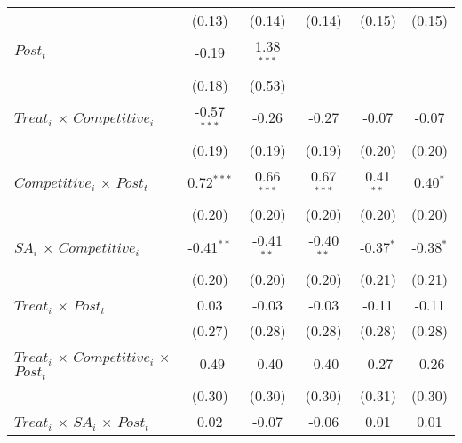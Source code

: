 \documentclass[
]{article}
\begin{document}
\begin{table}[htbp]
\begin{tabular}{lccccc}
                                                                              & (0.13)        & (0.14)        & (0.14)       & (0.15)      & (0.15)\\
      $Post_t$                                                                & -0.19         & 1.38$^{***}$  &              &             &   \\
                                                                              & (0.18)        & (0.53)        &              &             &   \\
      $Treat_i$ $\times$ $Competitive_i$                                     & -0.57$^{***}$ & -0.26         & -0.27        & -0.07       & -0.07\\
                                                                              & (0.19)        & (0.19)        & (0.19)       & (0.20)      & (0.20)\\
      $Competitive_i$ $\times$ $Post_t$                                      & 0.72$^{***}$  & 0.66$^{***}$  & 0.67$^{***}$ & 0.41$^{**}$ & 0.40$^{*}$\\
                                                                              & (0.20)        & (0.20)        & (0.20)       & (0.20)      & (0.20)\\
      $SA_i$ $\times$ $Competitive_i$                                        & -0.41$^{**}$  & -0.41$^{**}$  & -0.40$^{**}$ & -0.37$^{*}$ & -0.38$^{*}$\\
                                                                              & (0.20)        & (0.20)        & (0.20)       & (0.21)      & (0.21)\\
      $Treat_i$ $\times$ $Post_t$                                            & 0.03          & -0.03         & -0.03        & -0.11       & -0.11\\
                                                                              & (0.27)        & (0.28)        & (0.28)       & (0.28)      & (0.28)\\
      $Treat_i$ $\times$ $Competitive_i$ $\times$ $Post_t$                  & -0.49         & -0.40         & -0.40        & -0.27       & -0.26\\
                                                                              & (0.30)        & (0.30)        & (0.30)       & (0.31)      & (0.30)\\
      $Treat_i$ $\times$ $SA_i$ $\times$ $Post_t$                           & 0.02          & -0.07         & -0.06        & 0.01        & 0.01\\

\end{tabular}
\end{table}
\end{document}
